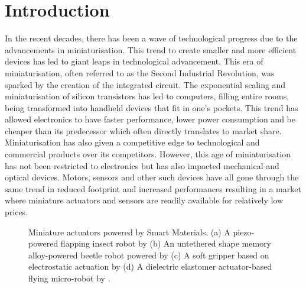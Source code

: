 
\cleardoublepage
\chapter*{Introduction}
In the recent decades, there has been a wave of technological progress due to the advancements in miniaturisation. This trend to create smaller and more efficient devices has led to giant leaps in technological advancement. This era of miniaturisation, often referred to as the Second Industrial Revolution, was sparked by the creation of the integrated circuit. The exponential scaling and miniaturisation of silicon transistors has led to computers, filling entire rooms, being transformed into handheld devices that fit in one's pockets. This trend has allowed electronics to have faster performance, lower power consumption and be cheaper than its predecessor which often directly translates to market share. Miniaturisation has also given a competitive edge to technological and commercial products over its competitors. However, this age of miniaturisation has not been restricted to electronics but has also impacted mechanical and optical devices. Motors, sensors and other such devices have all gone through the same trend in reduced footprint and increased performances resulting in a market where miniature actuators and sensors are readily available for relatively low prices.

\begin{figure}[hbt!]
    \centering
    \resizebox{0.8\textwidth}{!}{}
    \caption[Miniature actuators powered by Smart Materials]{Miniature actuators powered by Smart Materials. (a) A piezo-powered flapping insect robot by \cite{sreetharanMonolithicFabricationMillimeterscale2012} (b) An untethered shape memory alloy-powered beetle robot powered by \cite{yang88milligramInsectscaleAutonomous2020a} (c) A soft gripper based on electrostatic actuation by \cite{shintakeVersatileSoftGrippers2016} (d) A dielectric elastomer actuator-based flying micro-robot by \cite{chenControlledFlightMicrorobot2019}.}
    \label{fig:smart-actuator-examples}
\end{figure}

